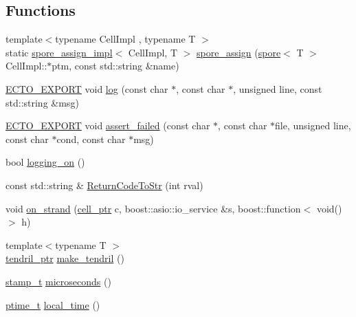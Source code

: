 \subsection*{Functions}
\begin{DoxyCompactItemize}
\item 
{\footnotesize template$<$typename Cell\+Impl , typename T $>$ }\\static \hyperlink{structecto_1_1spore__assign__impl}{spore\+\_\+assign\+\_\+impl}$<$ Cell\+Impl, T $>$ \hyperlink{namespaceecto_a776138cb830340922312c3ec98c15b6d}{spore\+\_\+assign} (\hyperlink{structecto_1_1spore}{spore}$<$ T $>$ Cell\+Impl\+::$\ast$ptm, const std\+::string \&name)
\item 
\hyperlink{util_8hpp_ab55b7868679cda60fc162580957fb98c}{E\+C\+T\+O\+\_\+\+E\+X\+P\+O\+R\+T} void \hyperlink{namespaceecto_a3870bebbdf6a0d01f28424e402be2834}{log} (const char $\ast$, const char $\ast$, unsigned line, const std\+::string \&msg)
\item 
\hyperlink{util_8hpp_ab55b7868679cda60fc162580957fb98c}{E\+C\+T\+O\+\_\+\+E\+X\+P\+O\+R\+T} void \hyperlink{namespaceecto_af79493e380ac31e886186e2ba1a1b809}{assert\+\_\+failed} (const char $\ast$, const char $\ast$file, unsigned line, const char $\ast$cond, const char $\ast$msg)
\item 
bool \hyperlink{namespaceecto_a34c1f436c47dc08392c8248632cde6f0}{logging\+\_\+on} ()
\item 
const std\+::string \& \hyperlink{namespaceecto_a00786d16020c07e60fea08e8352dba30}{Return\+Code\+To\+Str} (int rval)
\item 
void \hyperlink{namespaceecto_a653dab75b6cd892233b9f3676a5d2921}{on\+\_\+strand} (\hyperlink{namespaceecto_aed1809e82b9229ea81ef9ee3438cf62c}{cell\+\_\+ptr} c, boost\+::asio\+::io\+\_\+service \&s, boost\+::function$<$ void()$>$ h)
\item 
{\footnotesize template$<$typename T $>$ }\\\hyperlink{namespaceecto_a84fb5f6130275382e5cbeb5fdececa78}{tendril\+\_\+ptr} \hyperlink{namespaceecto_af284ea4dc605a1d2e037731e5f35eeaa}{make\+\_\+tendril} ()
\item 
\hyperlink{namespaceecto_a96ba8fa498cc4b8e2a0217a9e236b50d}{stamp\+\_\+t} \hyperlink{namespaceecto_af5e1929b12d596f7cc45a3fe7c76c5ed}{microseconds} ()
\item 
\hyperlink{namespaceecto_a5bbe8fb0da047cb18d92eb9dfb469652}{ptime\+\_\+t} \hyperlink{namespaceecto_a67829007171203782a69bde851cb1dc6}{local\+\_\+time} ()
\item 

\end{DoxyCompactItemize}

